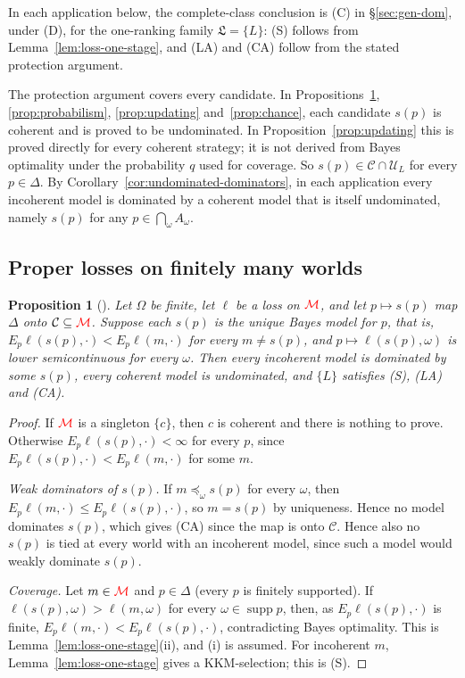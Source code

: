 \documentclass[11pt]{article}
\newcommand{\chg}[1]{{\color{red}#1}}
\newtheorem{proposition}[theorem]{Proposition}
\theoremstyle{definition}
\theoremstyle{remark}
\newcommand{\M}{\mathcal M}
\newcommand{\C}{\mathcal C}
\newcommand{\U}{\mathcal U}
\newcommand{\Lf}{\mathfrak L}
\newcommand{\supp}{\operatorname{supp}}
\begin{document}
\chg{In each application below, the complete-class conclusion is (C) in \S\ref{sec:gen-dom}, under (D), for the one-ranking family $\Lf=\{L\}$: (S) follows from Lemma~\ref{lem:loss-one-stage}, and (LA) and (CA) follow from the stated protection argument.}

The protection argument covers every candidate. In Propositions~\ref{prop:proper}, \ref{prop:probabilism}, \ref{prop:updating} and~\ref{prop:chance}, each candidate $s(p)$ is coherent and is proved to be undominated. In Proposition~\ref{prop:updating} this is proved directly for every coherent strategy; it is not derived from Bayes optimality under the probability $q$ used for coverage. So $s(p)\in\C\cap\U_L$ for every $p\in\Delta$. By Corollary~\ref{cor:undominated-dominators}, in each application every incoherent model is dominated by a coherent model that is itself undominated, namely $s(p)$ for any $p\in\bigcap_\omega A_\omega$.

\subsection{Proper losses on finitely many worlds}

\begin{proposition}[{\cite{Predd2009,Pettigrew2022}}]\label{prop:proper}
Let $\Omega$ be finite, let $\ell$ be a loss on $\chg{\M}$, and let $p\mapsto s(p)$ map $\Delta$ onto $\C\subseteq\chg{\M}$. Suppose each $s(p)$ is the unique Bayes model for $p$, that is, $E_p\ell(s(p),\cdot)<E_p\ell(m,\cdot)$ for every $m\ne s(p)$, and $p\mapsto\ell(s(p),\omega)$ is lower semicontinuous for every $\omega$. Then every incoherent model is dominated by some $s(p)$, every coherent model is undominated, and $\{L\}$ satisfies \chg{(S), (LA) and (CA)}.
\end{proposition}
\begin{proof}
If $\chg{\M}$ is a singleton $\{c\}$, then $c$ is coherent and there is nothing to prove. Otherwise $E_p\ell(s(p),\cdot)<\infty$ for every $p$, since $E_p\ell(s(p),\cdot)<E_p\ell(m,\cdot)$ for some $m$.

\emph{Weak dominators of $s(p)$.} If $m\preceq_\omega s(p)$ for every $\omega$, then $E_p\ell(m,\cdot)\le E_p\ell(s(p),\cdot)$, so $m=s(p)$ by uniqueness. Hence no model dominates $s(p)$, which gives \chg{(CA)} since the map is onto $\C$. Hence also no $s(p)$ is tied at every world with an incoherent model, since such a model would weakly dominate $s(p)$.

\emph{Coverage.} Let $m\in\chg{\M}$ and $p\in\Delta$ (every $p$ is finitely supported). If $\ell(s(p),\omega)>\ell(m,\omega)$ for every $\omega\in\supp p$, then, as $E_p\ell(s(p),\cdot)$ is finite, $E_p\ell(m,\cdot)<E_p\ell(s(p),\cdot)$, contradicting Bayes optimality. This is Lemma~\ref{lem:loss-one-stage}(ii), and (i) is assumed. For incoherent $m$, Lemma~\ref{lem:loss-one-stage} gives a KKM-selection; this is \chg{(S)}.
\end{proof}
\end{document}
